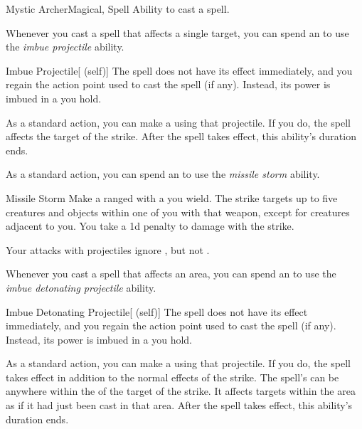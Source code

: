     \begin{feat}{Mystic Archer}{Magical, Spell}
        \featpre Ability to cast a spell.

         Whenever you cast a spell that affects a single target, you can spend an  to use the \textit{imbue projectile} ability.
        \begin{ability}{Imbue Projectile}[ (self)]
            The spell does not have its effect immediately, and you regain the action point used to cast the spell (if any).
            Instead, its power is imbued in a  you hold. 

            As a standard action, you can make a  using that projectile.
            If you do, the spell affects the target of the strike.
            After the spell takes effect, this ability's duration ends.
        \end{ability}

         As a standard action, you can spend an  to use the \textit{missile storm} ability.
        \begin{ability}{Missile Storm}
            Make a ranged  with a  you wield.
            The strike targets up to five creatures and objects within one  of you with that weapon, except for creatures adjacent to you.
            You take a \minus1d penalty to damage with the strike.
        \end{ability}

         Your attacks with projectiles ignore , but not .

         Whenever you cast a spell that affects an area, you can spend an  to use the \textit{imbue detonating projectile} ability.
        \begin{ability}{Imbue Detonating Projectile}[ (self)]
            The spell does not have its effect immediately, and you regain the action point used to cast the spell (if any).
            Instead, its power is imbued in a  you hold. 

            As a standard action, you can make a  using that projectile.
            If you do, the spell takes effect in addition to the normal effects of the strike.
            The spell's  can be anywhere within the  of the target of the strike.
            It affects targets within the area as if it had just been cast in that area.
            After the spell takes effect, this ability's duration ends.
        \end{ability}


\end{feat}
